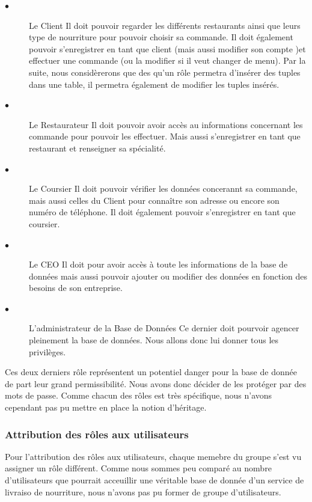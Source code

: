 \documentclass[french]{article}
\begin{document}
                \begin{description}
                    \item[$\bullet$]Le Client\newline
                     Il doit pouvoir regarder les différents restaurants ainsi que leurs type de nourriture pour pouvoir choisir sa commande. Il doit également pouvoir s'enregistrer en tant que client (mais aussi modifier son compte )et effectuer une commande (ou la modifier si il veut changer de menu). Par la suite, nous considèrerons que des qu'un rôle permetra d'insérer des tuples dans une table, il permetra également de modifier les tuples insérés.

                    \item[$\bullet$]Le Restaurateur\newline
                     Il doit pouvoir avoir accès au informations concernant les commande pour pouvoir les effectuer. Mais aussi s'enregistrer en tant que restaurant et renseigner sa spécialité.

                    \item[$\bullet$]Le Coursier\newline
                     Il doit pouvoir vérifier les données concerannt sa commande, mais aussi celles du Client pour connaître son adresse ou encore son numéro de téléphone. Il doit également pouvoir s'enregistrer en tant que coursier.

                    \item[$\bullet$]Le CEO\newline
                     Il doit pour avoir accès à toute les informations de la base de données mais aussi pouvoir ajouter ou modifier des données en fonction des besoins de son entreprise. 

                    \item[$\bullet$]L'administrateur de la Base de Données\newline
                     Ce dernier doit pourvoir agencer pleinement la base de données. Nous allons donc lui donner tous les privilèges.  
                \end{description}

                Ces deux derniers rôle représentent un potentiel danger pour la base de donnée de part leur grand permissibilité. Nous avons donc décider de les protéger par des mots de passe.\newline
                Comme chacun des rôles est très spécifique, nous n'avons cependant pas pu mettre en place la notion d'héritage.

            \subsubsection*{Attribution des rôles aux utilisateurs}
                Pour l'attribution des rôles aux utilisateurs, chaque memebre du groupe s'est vu assigner un rôle différent. Comme nous sommes peu comparé au nombre d'utilisateurs que pourrait acceuillir une véritable base de donnée d'un service de livraiso de nourriture, nous n'avons pas pu former de groupe d'utilisateurs.
\end{document}
